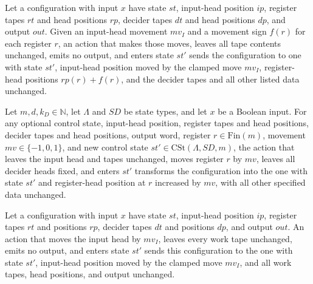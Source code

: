 \begin{lemma}
\label{Complexity.LogProg.apply_moves}
\leanok
{}
Let a configuration with input $x$ have state $st$, input-head position $ip$, register
tapes $rt$ and head positions $rp$, decider tapes $dt$ and head positions $dp$, and
output $out$. Given an input-head movement $mv_I$ and a movement sign $f(r)$ for each
register $r$, an action that makes those moves, leaves all tape contents unchanged,
emits no output, and enters state $st'$ sends the configuration to one with state $st'$,
input-head position moved by the clamped move $mv_I$, register-head positions
$rp(r)+f(r)$, and the decider tapes and all other listed data unchanged.
\end{lemma}

\begin{lemma}
\label{Complexity.LogProg.apply_regMove}
\leanok
{}
Let $m,d,k_D\in\mathbb N$, let $\Lambda$ and $SD$ be state types, and let $x$ be a
Boolean input. For any optional control state, input-head position, register tapes and
head positions, decider tapes and head positions, output word, register
$r\in\mathrm{Fin}(m)$, movement $mv\in\{-1,0,1\}$, and new control state
$st'\in\mathrm{CSt}(\Lambda,SD,m)$, the action that leaves the input head and tapes
unchanged, moves register $r$ by $mv$, leaves all decider heads fixed, and enters $st'$
transforms the configuration into the one with state $st'$ and register-head position at
$r$ increased by $mv$, with all other specified data unchanged.
\end{lemma}

\begin{lemma}
\label{Complexity.LogProg.apply_inputOnly}
\leanok
{}
Let a configuration with input $x$ have state $st$, input-head position $ip$, register
tapes $rt$ and positions $rp$, decider tapes $dt$ and positions $dp$, and output $out$.
An action that moves the input head by $mv_I$, leaves every work tape unchanged, emits
no output, and enters state $st'$ sends this configuration to the one with state $st'$,
input-head position moved by the clamped move $mv_I$, and all work tapes, head
positions, and output unchanged.
\end{lemma}

